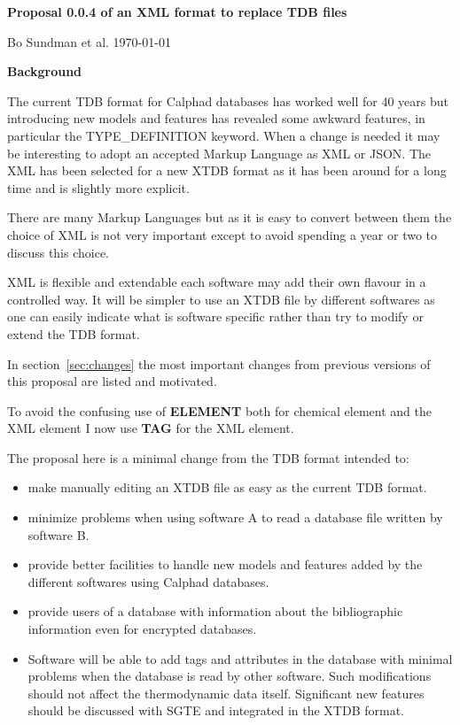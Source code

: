 \documentclass{article}
\begin{document}
\begin{center}

  {\Large \bf Proposal 0.0.4 of an XML format to replace TDB files}

  Bo Sundman et al. \today

  \vspace{5mm}

  {\large \bf Background}

\end{center}

\bigskip

The current TDB format for Calphad databases has worked well for 40
years but introducing new models and features has revealed some
awkward features, in particular the TYPE\_DEFINITION keyword.  When a
change is needed it may be interesting to adopt an accepted Markup
Language as XML or JSON.  The XML has been selected for a new XTDB
format as it has been around for a long time and is slightly more
explicit.

There are many Markup Languages but as it is easy to convert between
them the choice of XML is not very important except to avoid spending
a year or two to discuss this choice.

XML is flexible and extendable each software may add their own flavour
in a controlled way.  It will be simpler to use an XTDB file by
different softwares as one can easily indicate what is software
specific rather than try to modify or extend the TDB format.

In section~\ref{sec:changes} the most important changes from previous
versions of this proposal are listed and motivated.

To avoid the confusing use of {\bf ELEMENT} both for chemical element
and the XML element I now use {\bf TAG} for the XML element.

The proposal here is a minimal change from the TDB format intended to:
\begin{itemize}
  \item make manually editing an XTDB file as easy as the current TDB
    format.
  \item minimize problems when using software A to read a database
    file written by software B.
  \item provide better facilities to handle new models and features
    added by the different softwares using Calphad databases.
  \item provide users of a database with information about the
    bibliographic information even for encrypted databases.
  \item Software will be able to add tags and attributes in the
    database with minimal problems when the database is read by other
    software.  Such modifications should not affect the thermodynamic
    data itself.  Significant new features should be discussed with
    SGTE and integrated in the XTDB format.
\end{itemize}
\end{document}
